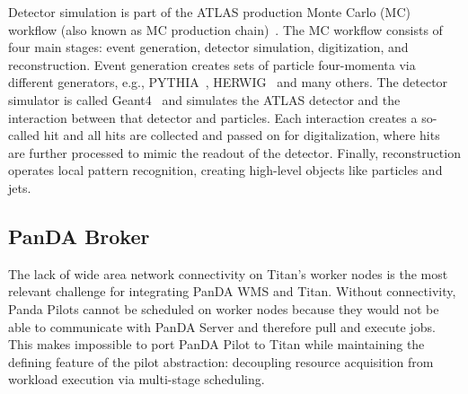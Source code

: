 Detector simulation is part of the ATLAS production Monte Carlo (MC) workflow
(also known as MC production
chain)~\cite{rimoldi2006atlas,de2013delphes,ritsch2014atlas}. The MC workflow
consists of four main stages: event generation, detector simulation,
digitization, and reconstruction. Event generation creates sets of particle
four-momenta via different generators, e.g., PYTHIA~\cite{sjostrand2006pythia},
HERWIG~\cite{corcella2001herwig} and many others.  The detector simulator is called
Geant4~\cite{agostinelli2003geant4} and simulates the ATLAS detector and the
interaction between that detector and particles.
Each interaction creates a so-called hit and all hits are collected and passed
on for digitalization, where hits are further processed to mimic the readout of
the detector. Finally, reconstruction operates local pattern recognition,
creating high-level objects like particles and jets.



\subsection{PanDA Broker}
\label{ssec:panda_titan}

The lack of wide area network connectivity on Titan's worker nodes is the most
relevant challenge for integrating PanDA WMS and Titan. Without connectivity,
Panda Pilots cannot be scheduled on worker nodes because they would not be able
to communicate with PanDA Server and therefore pull and execute jobs. This makes
impossible to port PanDA Pilot to Titan while maintaining the defining feature
of the pilot abstraction: decoupling resource acquisition from workload
execution via multi-stage scheduling.


